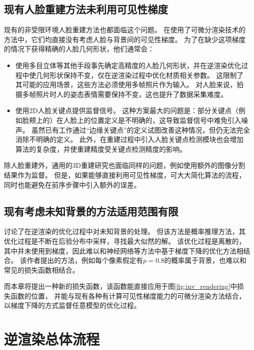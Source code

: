 \subsection{现有人脸重建方法未利用可见性梯度}

现有的非受限环境人脸重建方法也都面临这个问题。
在使用了可微分渲染技术的方法中，它们均直接没有考虑人脸与背景间的可见性梯度。
为了在缺少这项梯度的情况下获得精确的人脸几何形状，他们通常会：
\begin{itemize}
\item 使用多目立体等其他手段事先确定高精度的人脸几何形状，并在逆渲染优化过程中使几何形状保持不变，仅在逆渲染过程中优化材质相关参数\citep{RiviereGBGB20}。
这限制了其可能的应用场景，这些方法必须使用多帧照片作为输入。
对人脸来说，拍摄多帧照片时人的姿态表情需要保持不变，这也提升了数据采集难度。
\item 使用2D人脸关键点提供监督信号\citep{deep3d}。
这种方案最大的问题是：部分关键点（例如脸颊上的）在人脸上的位置定义是不明确的，这导致监督信号中难免引入噪声。
虽然已有工作\citep{qu122015adaptive}通过“边缘关键点”的定义试图改善这种情况，但仍无法完全消除不明确的定义。
此外，在重建过程中引入人脸关键点检测模块也会增加算法的复杂度，并使重建精度受关键点检测精度的影响。
\end{itemize}
除人脸重建外，通用的3D重建研究也面临同样的问题，例如\citet{nvdiffrec}使用额外的图像分割结果作为监督。
但是，如果能够直接利用可见性梯度，可大大简化算法的流程，同时也能避免在前序步骤中引入额外的误差。

\subsection{现有考虑未知背景的方法适用范围有限}

\citet{SchonbornEFV15}讨论了在逆渲染的优化过程中对未知背景的处理。
但该方法是概率推理方法，其优化过程是不断在后验分布中采样，寻找最大似然的解。
该优化过程是离散的，其中并未使用到梯度，因此难以和神经网络等方法中基于梯度下降的优化方法相结合。
该作者提出的方法，例如每个像素假定有$p=0.8$的概率属于背景，也难以和常见的损失函数相结合。

而本章将提出一种新的损失函数，该函数能直接应用于图\ref{fig:inv_rendering}中损失函数的位置，
并能与现有各种有计算可见性梯度能力的可微分渲染方法结合，以梯度下降的方式监督任意模型的优化过程。

\section{逆渲染总体流程}

